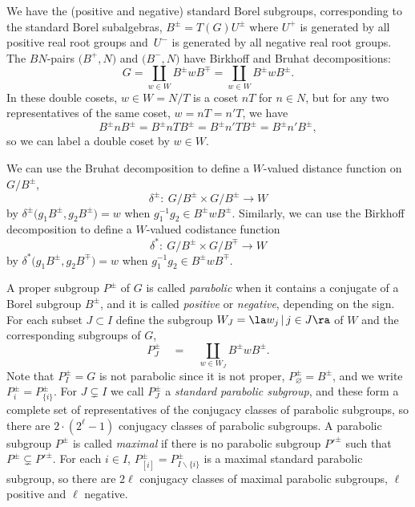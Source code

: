 We have the (positive and negative) standard Borel subgroups, corresponding to the standard Borel subalgebras, $B^{\pm}=T(G)U^{\pm}$ where $U^{+}$ is generated by all positive real root groups and~$U^-$ is generated by all negative real root groups. The $BN$-pairs $\big(B^+,N\big)$ and $\big(B^-,N\big)$ have Birkhoff and Bruhat decompositions:
\[G = \coprod_{w\in W} B^{\pm}wB^{\mp} = \coprod_{w\in W}B^{\pm}wB^{\pm}.\]
In these double cosets, $w\in W = N/T$ is a coset $nT$ for $n\in N$, but for any two representatives of the same coset, $w = nT = n'T$, we have
\[B^{\pm}nB^{\pm} = B^{\pm}nTB^{\pm} = B^{\pm}n'TB^{\pm} = B^{\pm}n'B^{\pm},\]
so we can label a double coset by $w\in W$.

We can use the Bruhat decomposition to define a $W$-valued distance function on $G/B^\pm$,
\[\delta^\pm \colon \ G/B^\pm \times G/B^\pm \to W\]
by $\delta^\pm\big(g_1 B^\pm, g_2 B^\pm\big) = w$ when $g_1^{-1} g_2 \in B^{\pm}wB^{\pm}$. Similarly, we can use the
Birkhoff decomposition to define a $W$-valued codistance function
\[\delta^* \colon \ G/B^\pm \times G/B^\mp \to W\]
by $\delta^*\big(g_1 B^\pm, g_2 B^\mp\big) = w$ when $g_1^{-1} g_2 \in B^{\pm}wB^{\mp}$.

A proper subgroup $P^{\pm}$ of $G$ is called {\em parabolic} when it contains a conjugate of a Borel subgroup $B^{\pm}$, and it is called \emph{positive} or \emph{negative}, depending on the sign. For each subset $J\subset I$ define the subgroup
 $W_J = \la w_j \, |\, j\in J\ra$ of $W$ and the corresponding subgroups of $G$,
\[P_J^\pm\quad = \quad \coprod_{w\in W_J}B^{\pm}wB^{\pm} .\]
Note that $P_I^\pm = G$ is not parabolic since it is not proper,
$P_{\varnothing}^\pm = B^{\pm}$, and we write $P_i^\pm = P_{\{i\}}^\pm$. For $J\subsetneq I$ we
call $P_J^\pm$ a {\em standard parabolic subgroup}, and these form a complete set of representatives of the conjugacy classes of parabolic subgroups, so there are $2\cdot (2^\ell-1)$ conjugacy classes of parabolic subgroups. A parabolic subgroup $P^{\pm}$ is called \emph{maximal} if there is no parabolic subgroup $P'^{\pm}$ such that $P^{\pm}\subsetneq P'^{\pm}$. For each $i\in I$,
$P_{[i]}^\pm = P_{I\backslash\{i\}}^\pm$ is a maximal standard parabolic subgroup, so there are $2\ell$ conjugacy classes of maximal parabolic subgroups, $\ell$ positive and $\ell$ negative.

